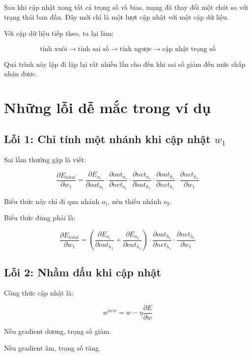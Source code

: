 \documentclass[12pt,a4paper]{report}
\begin{document}
Sau khi cập nhật xong tất cả trọng số và bias, mạng đã thay đổi một chút so với trạng thái ban đầu. Đây mới chỉ là một lượt cập nhật với một cặp dữ liệu.

Với cặp dữ liệu tiếp theo, ta lại làm:

\[
    \text{tính xuôi}
    \rightarrow
    \text{tính sai số}
    \rightarrow
    \text{tính ngược}
    \rightarrow
    \text{cập nhật trọng số}
\]

Quá trình này lặp đi lặp lại rất nhiều lần cho đến khi sai số giảm đến mức chấp nhận được.

\chapter{Những lỗi dễ mắc trong ví dụ}

\section{Lỗi 1: Chỉ tính một nhánh khi cập nhật $w_1$}

Sai lầm thường gặp là viết:

\[
    \frac{\partial E_{total}}{\partial w_1}
    =
    \frac{\partial E_{o_1}}{\partial out_{o_1}}
    \cdot
    \frac{\partial out_{o_1}}{\partial net_{o_1}}
    \cdot
    \frac{\partial net_{o_1}}{\partial out_{h_1}}
    \cdot
    \frac{\partial out_{h_1}}{\partial net_{h_1}}
    \cdot
    \frac{\partial net_{h_1}}{\partial w_1}
\]

Biểu thức này chỉ đi qua nhánh $o_1$, nên thiếu nhánh $o_2$.

Biểu thức đúng phải là:

\[
    \frac{\partial E_{total}}{\partial w_1}
    =
    \left(
    \frac{\partial E_{o_1}}{\partial out_{h_1}}
    +
    \frac{\partial E_{o_2}}{\partial out_{h_1}}
    \right)
    \cdot
    \frac{\partial out_{h_1}}{\partial net_{h_1}}
    \cdot
    \frac{\partial net_{h_1}}{\partial w_1}
\]

\section{Lỗi 2: Nhầm dấu khi cập nhật}

Công thức cập nhật là:

\[
    w^{new}=w-\eta\frac{\partial E}{\partial w}
\]

Nếu gradient dương, trọng số giảm.

Nếu gradient âm, trọng số tăng.
\end{document}
